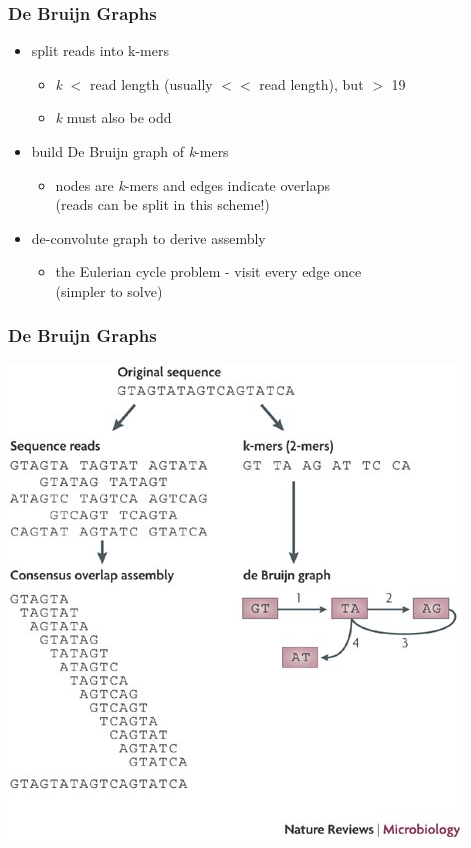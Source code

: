 \documentclass[pdf]{beamer}
\begin{document}
\begin{frame}
\frametitle{De Bruijn Graphs}
\begin{itemize}
\item split reads into k-mers
\begin{itemize}
\item \textit{k} $<$ read length (usually $<<$ read length), but $>$ 19
\item \textit{k} must also be odd
\end{itemize}
\item build De Bruijn graph of \textit{k}-mers
\begin{itemize}
\item nodes are \textit{k}-mers and edges indicate overlaps\\(reads can be split in this scheme!)
\end{itemize}
\item de-convolute graph to derive assembly
\begin{itemize}
\item the Eulerian cycle problem - visit every edge once\\(simpler to solve)
\end{itemize}
\end{itemize}

\end{frame}

\begin{frame}
\frametitle{De Bruijn Graphs}
\begin{center}
\includegraphics[scale=0.45]{Figures/smallEx.jpg} 
\end{center}
\end{frame}
\end{document}
